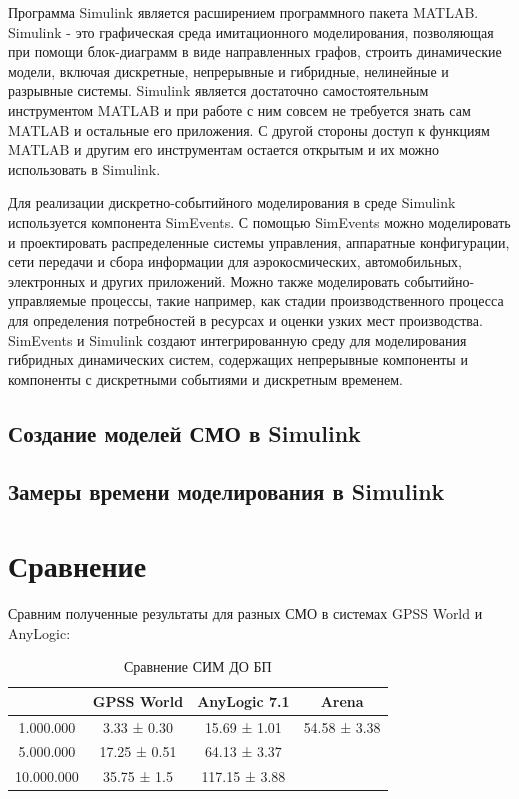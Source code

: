 \documentclass[a4paper,14pt]{report} %
\begin{document}
Программа Simulink является расширением программного пакета MATLAB. Simulink - это графическая среда имитационного моделирования, позволяющая при помощи блок-диаграмм в виде направленных графов, строить динамические модели, включая дискретные, непрерывные и гибридные, нелинейные и разрывные системы. Simulink является достаточно самостоятельным инструментом MATLAB и при работе с ним совсем не требуется знать сам MATLAB и остальные его приложения. С другой стороны доступ к функциям MATLAB и другим его инструментам остается открытым и их можно использовать в Simulink. 

Для реализации дискретно-событийного моделирования в среде Simulink используется компонента SimEvents. С помощью SimEvents можно моделировать и проектировать распределенные системы управления, аппаратные конфигурации, сети передачи и сбора информации для аэрокосмических, автомобильных, электронных и других приложений. Можно также моделировать событийно-управляемые процессы, такие например, как стадии производственного процесса для определения потребностей в ресурсах и оценки узких мест производства. SimEvents и Simulink создают интегрированную среду для моделирования гибридных динамических систем, содержащих непрерывные компоненты и компоненты с дискретными событиями и дискретным временем. 

\subsection{Создание моделей СМО в Simulink}

\subsection{Замеры времени моделирования в Simulink}

\section{Сравнение}
Сравним полученные результаты для разных СМО в системах GPSS World и AnyLogic: 

\begin{table}[h!]
\caption{Сравнение СИМ ДО БП}
\begin{tabular}{|c|c|c|c|}
\hline
 & GPSS World & AnyLogic 7.1  &  Arena\\
\hline
1.000.000 & 3.33 ± 0.30 & 15.69 ± 1.01 & 54.58 ± 3.38\\
\hline
5.000.000 & 17.25 ± 0.51 & 64.13 ± 3.37 & \\
\hline
10.000.000 & 35.75 ± 1.5 & 117.15 ± 3.88 &  \\
\hline
\end{tabular}
\end{table} 
\end{document}
